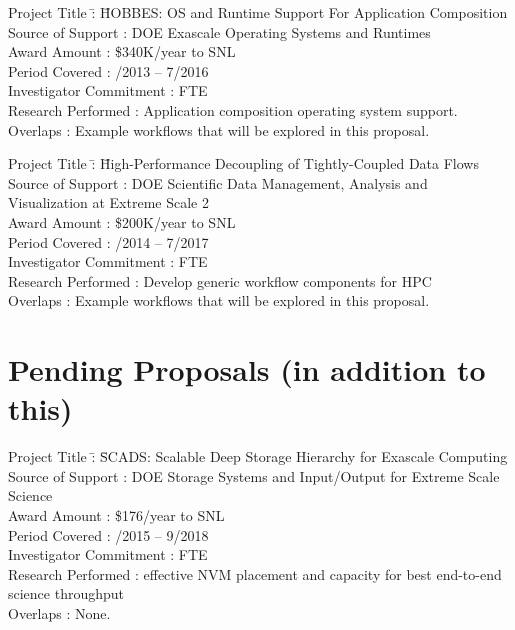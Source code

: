 \documentclass[10pt]{article}
\begin{document}
\begin{tabbing}
Project Title \hspace{5.5em}\=: \=  HOBBES: OS and Runtime Support For Application Composition\\
Source of Support           \>:  DOE Exascale Operating Systems and Runtimes\\
Award Amount                \>: \> \$340K/year to SNL\\
Period Covered              \>: /2013 -- 7/2016\\
Investigator Commitment     \>:  FTE\\
Research Performed          \>: \> Application composition operating system support.\\
Overlaps                    \>: \> Example workflows that will be explored in this proposal.\\
\end{tabbing}

\begin{tabbing}
Project Title \hspace{5.5em}\=: \= High-Performance Decoupling of Tightly-Coupled Data Flows\\
Source of Support           \>: \> DOE Scientific Data Management, Analysis and Visualization at Extreme Scale 2\\
Award Amount                \>: \> \$200K/year to SNL\\
Period Covered              \>: /2014 -- 7/2017\\
Investigator Commitment     \>:  FTE\\
Research Performed          \>: \> Develop generic workflow components for HPC\\
Overlaps                    \>: \> Example workflows that will be explored in this proposal.\\
\end{tabbing}

\section*{Pending Proposals (in addition to this)}

\begin{tabbing}
Project Title \hspace{5.5em}\=: \= SCADS: Scalable Deep Storage Hierarchy for Exascale Computing\\
Source of Support           \>: \> DOE Storage Systems and Input/Output for Extreme Scale Science\\
Award Amount                \>: \> \$176/year to SNL\\
Period Covered              \>: /2015 -- 9/2018\\
Investigator Commitment     \>:  FTE\\
Research Performed          \>: \> effective NVM placement and capacity for best end-to-end science throughput\\
Overlaps                    \>: \> None.\\
\end{tabbing}
\end{document}
